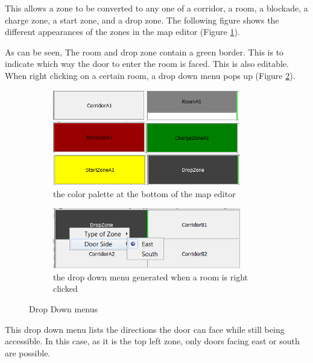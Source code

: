 This allows a zone to be converted to any one of a corridor, a room, a blockade, a charge zone, a start zone, and a drop zone. The following figure shows the different appearances of the zones in the map editor (Figure \ref{fig:DifferentRooms}).

As can be seen, The room and drop zone contain a green border. This is to indicate which way the door to enter the room is faced. This is also editable. When right clicking on a certain room, a drop down menu pops up (Figure \ref{DropDownMenuRoom2}).



 \begin{figure}
        \centering
        \begin{subfigure}[b]{0.5\textwidth}
		\includegraphics[width=0.9\textwidth]{EnvironmentStore/DifferentRooms.png}
		\caption{the color palette at the bottom of the map editor}\label{fig:DifferentRooms}
        \end{subfigure}%
        \begin{subfigure}[b]{0.5\textwidth}
	\includegraphics[width=0.9\textwidth]{EnvironmentStore/DropDownMenuRoom2.png}
	\caption{the drop down menu generated when a room is right clicked}\label{DropDownMenuRoom2}
        \end{subfigure}
        \caption{Drop Down menus}\label{fig:animals}
\end{figure}




This drop down menu lists the directions the door can face while still being accessible. In this case, as it is the top left zone, only doors facing east or south are possible.
